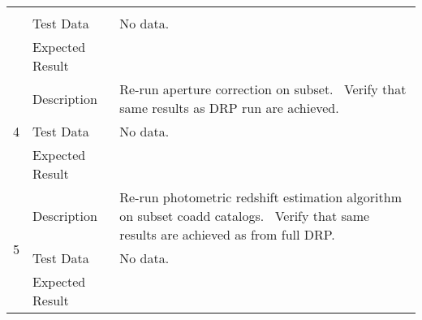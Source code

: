 \begin{longtable}[]{p{1.3cm}p{2cm}p{13cm}}
\begin{minipage}[t]{13cm}
{            \vspace{\dp0}
            } \end{minipage} \\ \cline{2-3}
            & Test Data &
            \begin{minipage}[t]{13cm}{\footnotesize
                No data.
                \vspace{\dp0}
            } \end{minipage} \\ \cline{2-3}
            & Expected Result &
        \\ \midrule

            \multirow{3}{*}{ 4 } & Description &
            \begin{minipage}[t]{13cm}{\footnotesize
            Re-run aperture correction on subset. ~Verify that same results as DRP
run are achieved.

            \vspace{\dp0}
            } \end{minipage} \\ \cline{2-3}
            & Test Data &
            \begin{minipage}[t]{13cm}{\footnotesize
                No data.
                \vspace{\dp0}
            } \end{minipage} \\ \cline{2-3}
            & Expected Result &
        \\ \midrule

            \multirow{3}{*}{ 5 } & Description &
            \begin{minipage}[t]{13cm}{\footnotesize
            Re-run photometric redshift estimation algorithm on subset coadd
catalogs. ~Verify that same results are achieved as from full DRP.

            \vspace{\dp0}
            } \end{minipage} \\ \cline{2-3}
            & Test Data &
            \begin{minipage}[t]{13cm}{\footnotesize
                No data.
                \vspace{\dp0}
            } \end{minipage} \\ \cline{2-3}
            & Expected Result &
        \\ \midrule


\end{longtable}
